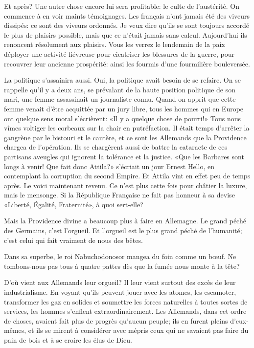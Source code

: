 \begin{chapter}{Et après?}
Une autre chose encore lui sera profitable: le culte de l'austérité. On
commence à en voir maints témoignages. Les français n'ont jamais été des
viveurs dissipés: ce sont des viveurs ordonnés. Je veux dire qu'ils se
sont toujours accordé le plus de plaisirs possible, mais que ce n'était
jamais sans calcul. Aujourd'hui ils renoncent résolument aux plaisirs.
Vous les verrez le lendemain de la paix déployer une activité fiévreuse
pour cicatriser les blessures de la guerre, pour recouvrer leur ancienne
prospérité: ainsi les fourmis d'une fourmilière bouleversée.

La politique s'assainira aussi. Oui, la politique avait besoin de se
refaire. On se rappelle qu'il y a deux ans, se prévalant de la haute
position politique de son mari, une femme assassinait un journaliste
connu. Quand on apprit que cette femme venait d'être acquittée par un
jury libre, tous les hommes qui en Europe ont quelque sens moral
s'écrièrent: «Il y a quelque chose de pourri!» Tous nous vîmes voltiger
les corbeaux sur la chair en putréfaction. Il était temps d'arrêter la
gangrène par le bistouri et le cautère, et ce sont les Allemands que la
Providence chargea de l'opération. Ils se chargèrent aussi de battre la
cataracte de ces partisans aveugles qui ignorent la tolérance et la
justice. «Que les Barbares sont longs à venir! Que fait donc Attila?»
s'écriait un jour Ernest Hello, en contemplant la corruption du second
Empire. Et Attila vint en effet peu de temps après. Le voici maintenant
revenu. Ce n'est plus cette fois pour châtier la luxure, mais le
mensonge. Si la République Française ne fait pas honneur à sa devise
«Liberté, Égalité, Fraternité», à quoi sert-elle?

Mais la Providence divine a beaucoup plus à faire en Allemagne. Le grand
péché des Germains, c'est l'orgueil. Et l'orgueil est le plus grand
péché de l'humanité; c'est celui qui fait vraiment de nous des bêtes.

Dans sa superbe, le roi Nabuchodonosor mangea du foin comme un bœuf.
Ne tombons-nous pas tous à quatre pattes dès que la fumée nous monte à
la tête?

D'où vient aux Allemands leur orgueil? Il leur vient surtout des excès
de leur industrialisme. En voyant qu'ils peuvent jouer avec les atomes,
les escamoter, transformer les gaz en solides et soumettre les forces
naturelles à toutes sortes de services, les hommes s'enflent
extraordinairement. Les Allemands, dans cet ordre de choses, avaient
fait plus de progrès qu'aucun peuple; ils en furent pleins d'eux-mêmes,
et ils se mirent à considérer avec mépris ceux qui ne savaient pas faire
du pain de bois et à se croire les élus de Dieu.


\end{chapter}
